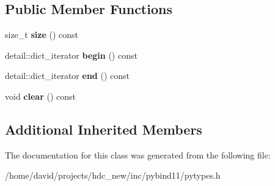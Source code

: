 \subsection*{Public Member Functions}
\begin{DoxyCompactItemize}
\item 
size\+\_\+t {\bfseries size} () const \hypertarget{classdict_abde083ade624ae62889662ca3edbb3b6}{}\label{classdict_abde083ade624ae62889662ca3edbb3b6}

\item 
detail\+::dict\+\_\+iterator {\bfseries begin} () const \hypertarget{classdict_a97de7b7f298cb162d07700ab2b8a5e6f}{}\label{classdict_a97de7b7f298cb162d07700ab2b8a5e6f}

\item 
detail\+::dict\+\_\+iterator {\bfseries end} () const \hypertarget{classdict_acdce779ebf89f6994a7de2eb9eb53bd2}{}\label{classdict_acdce779ebf89f6994a7de2eb9eb53bd2}

\item 
void {\bfseries clear} () const \hypertarget{classdict_a236163b9e27debdf938e5bfb6d9f05b7}{}\label{classdict_a236163b9e27debdf938e5bfb6d9f05b7}

\end{DoxyCompactItemize}
\subsection*{Additional Inherited Members}


The documentation for this class was generated from the following file\+:\begin{DoxyCompactItemize}
\item 
/home/david/projects/hdc\+\_\+new/inc/pybind11/pytypes.\+h\end{DoxyCompactItemize}
